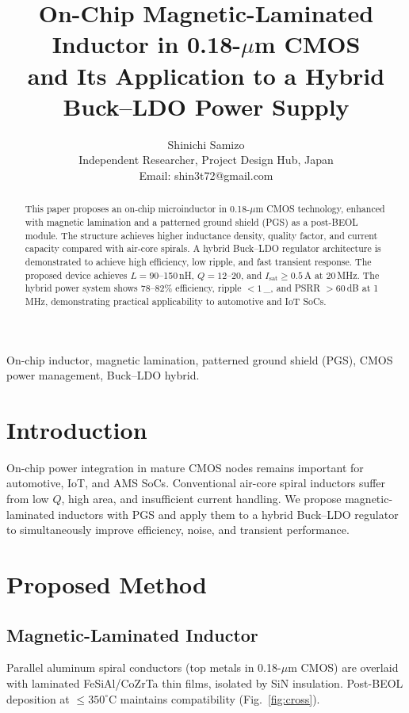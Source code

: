 \documentclass[journal]{IEEEtran}
\begin{document}
\title{On-Chip Magnetic-Laminated Inductor in 0.18-$\mu$m CMOS\\
and Its Application to a Hybrid Buck--LDO Power Supply}

\author{Shinichi Samizo\\
Independent Researcher, Project Design Hub, Japan\\
Email: shin3t72@gmail.com}

\maketitle

\begin{abstract}
This paper proposes an on-chip microinductor in 0.18-$\mu$m CMOS technology, enhanced with magnetic lamination and a patterned ground shield (PGS) as a post-BEOL module. The structure achieves higher inductance density, quality factor, and current capacity compared with air-core spirals. A hybrid Buck--LDO regulator architecture is demonstrated to achieve high efficiency, low ripple, and fast transient response. The proposed device achieves $L=90$--150\,nH, $Q=12$--20, and $I_{\text{sat}} \geq 0.5$\,A at 20\,MHz. The hybrid power system shows 78--82\% efficiency, ripple $<1$\,_{}, and PSRR $>60$\,dB at 1\,MHz, demonstrating practical applicability to automotive and IoT SoCs.
\end{abstract}

\begin{IEEEkeywords}
On-chip inductor, magnetic lamination, patterned ground shield (PGS), CMOS power management, Buck--LDO hybrid.
\end{IEEEkeywords}

\section{Introduction}
On-chip power integration in mature CMOS nodes remains important for automotive, IoT, and AMS SoCs. Conventional air-core spiral inductors suffer from low $Q$, high area, and insufficient current handling. We propose magnetic-laminated inductors with PGS and apply them to a hybrid Buck--LDO regulator to simultaneously improve efficiency, noise, and transient performance.

\section{Proposed Method}
\subsection{Magnetic-Laminated Inductor}
Parallel aluminum spiral conductors (top metals in 0.18-$\mu$m CMOS) are overlaid with laminated FeSiAl/CoZrTa thin films, isolated by SiN insulation. Post-BEOL deposition at $\leq350^\circ$C maintains compatibility (Fig.~\ref{fig:cross}).
\end{document}
